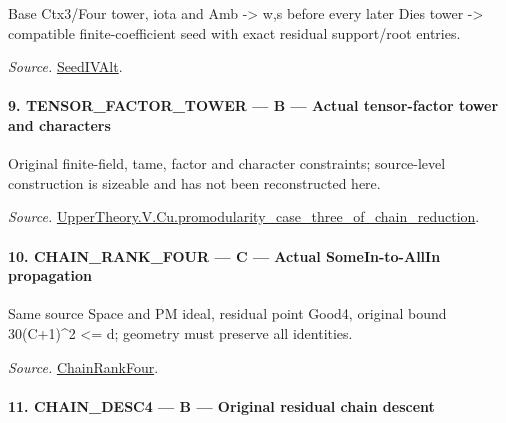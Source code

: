 \documentclass[11pt,a4paper]{article}
\numberwithin{equation}{section}
\theoremstyle{remark}\newtheorem{remark}[theorem]{Remark}
\begin{document}
Base Ctx3/Four tower, iota and Amb -> w,s before every later Dies tower -> compatible finite-coefficient seed with exact residual support/root entries.

\emph{Source.} \href{https://github.com/CocoSgt/riemann-hypothesis-lean/blob/7cbf7a0c32fca1badf05931879a37c3f8a2b03b4/src/Development/AutomorphicArithmetic/AutomorphicVarieties/ModularityArgument/ThresholdArguments/DenseThresholdCases/PromodularityCaseThree.lean#L19-L25}{SeedIVAlt}.



\paragraph{9. TENSOR\_\allowbreak FACTOR\_\allowbreak TOWER — B — Actual tensor-factor tower and characters}

Original finite-field, tame, factor and character constraints; source-level construction is sizeable and has not been reconstructed here.

\emph{Source.} \href{https://github.com/CocoSgt/riemann-hypothesis-lean/blob/7cbf7a0c32fca1badf05931879a37c3f8a2b03b4/src/Development/AutomorphicArithmetic/AutomorphicVarieties/ModularityArgument/ThresholdArguments/DenseThresholdCases/PromodularityCaseThreeOfLemmas.lean#L131-L153}{UpperTheory.V.Cu.promodularity\_\allowbreak case\_\allowbreak three\_\allowbreak of\_\allowbreak chain\_\allowbreak reduction}.



\paragraph{10. CHAIN\_\allowbreak RANK\_\allowbreak FOUR — C — Actual SomeIn-to-AllIn propagation}

Same source Space and PM ideal, residual point Good4, original bound 30(C+1)\textasciicircum{}2 <= d; geometry must preserve all identities.

\emph{Source.} \href{https://github.com/CocoSgt/riemann-hypothesis-lean/blob/7cbf7a0c32fca1badf05931879a37c3f8a2b03b4/src/Development/AutomorphicArithmetic/AutomorphicVarieties/ModularityArgument/ThresholdArguments/DenseThresholdCases/PromodularityCaseThree.lean#L26-L32}{ChainRankFour}.



\paragraph{11. CHAIN\_\allowbreak DESC4 — B — Original residual chain descent}
\end{document}
